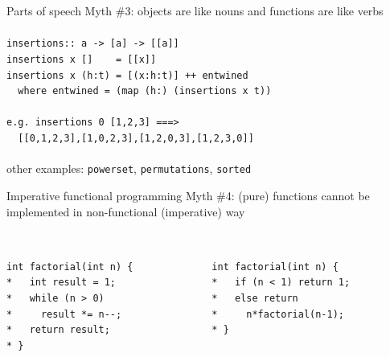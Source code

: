\documentclass{beamer}
\begin{document}
\begin{frame}{Parts of speech}
  Myth \#3: objects are like nouns and functions are like verbs \\ \pause
  \ \\
  \texttt{insertions:: a -> [a] -> [[a]]\\ \pause
    insertions x []\ \ \ \ = [[x]] \\
    insertions x (h:t) = [(x:h:t)] ++ entwined\\
    \ \ where entwined = (map\,(h:)\,(insertions~x~t))
  } \\ \pause
  \ \\
  \texttt{e.g.\,insertions 0 [1,2,3] ===>\\
    \ \ [[0,1,2,3],[1,0,2,3],[1,2,0,3],[1,2,3,0]]
  } \\ \pause
  \ \\
  other examples: \texttt{powerset}, \texttt{permutations},
  \texttt{sorted}
  
\end{frame}

\begin{frame}{Imperative functional programming} \pause
  Myth \#4: (pure) functions cannot be implemented in non-functional
  (imperative) way \\ \pause
  \ \\
  \begin{columns}[T] %
    \begin{column}{.48\textwidth}
      \begin{small}
        \texttt{int factorial(int n) \{\\*
          \ \ int result = 1;\\*
          \ \ while (n > 0)\\*
          \ \ \ \ result *= n-\phantom{}-;\\*
          \ \ return result;\\*
          \}}
      \end{small}
    \end{column}%
    \hfill%
    \pause
    \begin{column}{.48\textwidth}
      \begin{small}
        \texttt{int factorial(int n) \{\\*
          \ \ if (n < 1) return 1; \\*
          \ \ else return\\*
          \ \ \ \ n*factorial(n-1);\\*
          \}}
      \end{small}
    \end{column}
  \end{columns} 
\end{frame}
\end{document}
